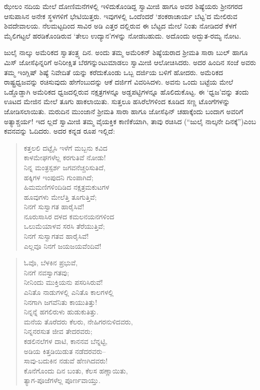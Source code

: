 ಝೇಲಂ ನದಿಯ ಮೇಲೆ ದೋಣಿಮನೆಗಳಲ್ಲಿ ಇಳಿದುಕೊಂಡಿದ್ದ ಸ್ವಾಮೀಜಿ ಹಾಗೂ ಅವರ ಶಿಷ್ಯೆಯರು ಶ್ರೀನಗರದ ಆಸುಪಾಸಿನ ಅನೇಕ ಸ್ಥಳಗಳಿಗೆ ಭೇಟಿಯಿತ್ತರು. ಇವುಗಳಲ್ಲಿ ಒಂದೆಂದರೆ ‘ಶಂಕರಾಚಾರ್ಯ ಬೆಟ್ಟ’ದ ಮೇಲಿರುವ ಶಿವದೇವಾಲಯ. ನೆಲಮಟ್ಟದಿಂದ ಸಾವಿರ ಅಡಿ ಎತ್ತರ ದಲ್ಲಿರುವ ಈ ಬೆಟ್ಟದ ಮೇಲೆ ನಿಂತು ನೋಡಿದರೆ ಕೆಳಗೆ ಮೈಲಿಗಟ್ಟಲೆ ಹರಡಿಕೊಂಡಿರುವ ‘ತೇಲು ಉದ್ಯಾನ’ಗಳನ್ನು ನೋಡಬಹುದು. ಅದೊಂದು ಅದ್ಭುತ-ರಮ್ಯ ನೋಟ.

ಜುಲೈ ನಾಲ್ಕು ಅಮೆರಿಕದ ಸ್ವಾತಂತ್ರ್ಯ ದಿನ. ಅಂದು ತಮ್ಮ ಅಮೆರಿಕನ್ ಶಿಷ್ಯೆಯರಾದ ಶ್ರೀಮತಿ ಸಾರಾ ಬುಲ್ ಹಾಗೂ ಮಿಸ್ ಜೋಸೆಫಿನ್ನರಿಗೆ ಅನಿರೀಕ್ಷಿತ ಬೆರಗನ್ನುಂಟುಮಾಡಲು ಸ್ವಾಮೀಜಿ ಆಲೋಚಿಸಿದರು. ಅದರ ಹಿಂದಿನ ಸಂಜೆ ಅವರು ತಮ್ಮ ಇಂಗ್ಲಿಷ್ ಶಿಷ್ಯೆ ನಿವೇದಿತೆ ಯನ್ನು ಕರೆದುಕೊಂಡು ಒಬ್ಬ ದರ್ಜಿಯ ಬಳಿಗೆ ಹೋದರು. ಅಮೆರಿಕದ ರಾಷ್ಟ್ರಧ್ವಜವನ್ನು ರಚಿಸುವುದು ಹೇಗೆಂಬುದನ್ನು ಆಕೆ ದರ್ಜಿಗೆ ವಿವರಿಸಿದಳು. ಅವನು ಒಂದು ಬಟ್ಟೆಯ ಮೇಲೆ ಒಡ್ಡೊಡ್ಡಾಗಿ ಅಮೆರಿಕದ ಧ್ವಜದಲ್ಲಿರುವ ನಕ್ಷತ್ರಗಳನ್ನೂ ಅಡ್ಡಪಟ್ಟಿಗಳನ್ನೂ ಹೊಲಿದುಕೊಟ್ಟ. ಈ ‘ಧ್ವಜ’ವನ್ನು ತಂದು ಊಟದ ಮೇಜಿನ ಮೇಲೆ ತೂಗು ಹಾಕಲಾಯಿತು. ಸುತ್ತಲೂ ಹಸಿರೆಲೆಗಳಿಂದ ಕೂಡಿದ ಸಣ್ಣ ಟೊಂಗೆಗಳನ್ನು ಜೋಡಿಸಲಾಯಿತು. ಮರುದಿನ ಮುಂಜಾನೆ ಶ್ರೀಮತಿ ಸಾರಾ ಹಾಗೂ ಜೋಸೆಫಿನ್ ಚಹಾಕ್ಕೆಂದು ಬಂದಾಗ ಅವರಿಗೆ ಅತ್ಯಾಶ್ಚರ್ಯ! ಇದ ಲ್ಲದೆ ಸ್ವಾಮೀಜಿ ತಮ್ಮ ವೈಯಕ್ತಿಕ ಕಾಣಿಕೆಯಾಗಿ, ತಾವು ರಚಿಸಿದ  (“ಜುಲೈ ನಾಲ್ಕನೇ ದಿನಕ್ಕೆ”)ಎಂಬ ಕವನವನ್ನು ಓದಿದರು. ಅದರ ಕನ್ನಡ ರೂಪ ಇಲ್ಲಿದೆ:

\begin{verse}
ಕತ್ತಲಲಿ ದಟ್ಟೈಸಿ ಇಳೆಗೆ ಮಬ್ಬನು ಕವಿದ\\ಕಾಳಮೇಘಗಳೆಲ್ಲ ಕರಗುತಿವೆ ನೋಡು!\\ನಿನ್ನ ಮಂತ್ರಸ್ಪರ್ಶ ಜಗವನೆಚ್ಚರಿಸುತಿದೆ,\\ಹಕ್ಕಿಗಳ ಇಂಪುದನಿ ಗುಂಪಾಗಿದೆ;\\ಹಿಮಮಣಿಗಳಿಂದಿಡಿದ ನಕ್ಷತ್ರಮಕುಟಗಳ\\ಹೂವುಗಳು ಮೇಲೆತ್ತಿ ತೂಗುತ್ತಿವೆ;\\ನಿನಗೆ ಸುಸ್ವಾಗತ ಹಾರೈಸಿವೆ!\\ನೂರುಸಾಸಿರ ದಳದ ಕಮಲನಯನಗಳಿಂದ\\ಒಲುಮೆಯಾಳವ ಸರಸಿ ತೆರೆಯುತ್ತಿವೆ;\\ನಿನಗೆ ಸುಸ್ವಾಗತವ ಹಾರೈಸಿವೆ!\\ಎಲ್ಲವೂ ನಿನಗೆ ಜಯಜಯವೆಂದಿವೆ!
\end{verse}

\begin{verse}
ಓವೊ, ಬೆಳಕಿನ ಪ್ರಭುವೆ,\\ನಿನಗೆ ನವಸ್ವಾಗತವು;\\ನೀನಿಂದು ಮುಕ್ತಿಯನು ಪಸರಿಸಿರುವೆ!\\ಎನಿತೊ ನಾಡುಗಳಲ್ಲಿ ಎನಿತೊ ಕಾಲಗಳಲ್ಲಿ\\ನಿನಗಾಗಿ ಜಗವೆನಿತು ಕಾಯುತಿತ್ತು!\\ನಿನ್ನನ್ನೆ ಹಗಲಿರುಳು ಹುಡುಕುತಿತ್ತು.\\ಮನೆಯ ತೊರೆದರು ಕೆಲರು, ನೇಹಿಗರನುಳಿದವರು,\\ನಿನ್ನನರಸುತ ಜೀವ ತೇದರವರು;\\ಕಡಲಿನಲೆಗಳ ದಾಟಿ, ಕಾನನವ ಬೆನ್ನಟ್ಟಿ,\\ಅಡಿಯ ಕಿತ್ತಡಿಯಿಡುತ ನಡೆದರವರು–\\ಸಾವು-ಬದುಕಿನ ನಡುವೆ ಹೆಣಗಿದವರು!\\ಕೊನೆಗೊಂದು ದಿನ ಬಂತು, ಕೆಲಸ ಹಣ್ಣಾಯಿತು,\\ತ್ಯಾಗ-ಪೂಜೆಗಳೆಲ್ಲ ಪೂರ್ಣವಾಯ್ತು.
\end{verse}

